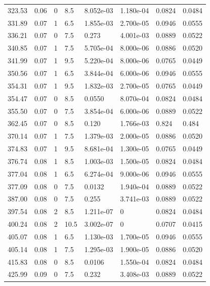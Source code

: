 \documentclass[preview]{standalone}
\begin{document}
{{{\begin{tabular}{L{1.2cm}C{1.2cm} C{0.3cm}C{0.5cm} C{1.4cm}C{1.4cm} C{1.4cm}C{1.4cm}}
  323.53  &  0.06  & 0     & 8.5 &  8.052e-03  & 1.180e-04  & 0.0824 &  0.0484   \\ 
  331.89  &  0.07  & 1     & 6.5 &  1.855e-03  & 2.700e-05  & 0.0946 &  0.0555   \\ 
  336.21  &  0.07  & 0     & 7.5 &  0.273  & 4.001e-03  & 0.0889 &  0.0522   \\ 
  340.85  &  0.07  & 1     & 7.5 &  5.705e-04  & 8.000e-06  & 0.0886 &  0.0520   \\ 
  341.99  &  0.07  & 1     & 9.5 &  5.220e-04  & 8.000e-06  & 0.0765 &  0.0449   \\ 
  350.56  &  0.07  & 1     & 6.5 &  3.844e-04  & 6.000e-06  & 0.0946 &  0.0555   \\ 
  354.31  &  0.07  & 1     & 9.5 &  1.832e-03  & 2.700e-05  & 0.0765 &  0.0449   \\ 
  354.47  &  0.07  & 0     & 8.5 &  0.0550  & 8.070e-04  & 0.0824 &  0.0484   \\ 
  355.50  &  0.07  & 0     & 7.5 &  3.854e-04  & 6.000e-06  & 0.0889 &  0.0522   \\ 
  362.45  &  0.07  & 0     & 8.5 &  0.120  & 1.766e-03  & 0.824 &  0.484   \\ 
  370.14  &  0.07  & 1     & 7.5 &  1.379e-03  & 2.000e-05  & 0.0886 &  0.0520   \\ 
  374.83  &  0.07  & 1     & 9.5 &  8.681e-04  & 1.300e-05  & 0.0765 &  0.0449   \\ 
  376.74  &  0.08  & 1     & 8.5 &  1.003e-03  & 1.500e-05  & 0.0824 &  0.0484   \\ 
  377.04  &  0.08  & 1     & 6.5 &  6.274e-04  & 9.000e-06  & 0.0946 &  0.0555   \\ 
  377.09  &  0.08  & 0     & 7.5 &  0.0132  & 1.940e-04  & 0.0889 &  0.0522   \\ 
  387.00  &  0.08  & 0     & 7.5 &  0.255  & 3.741e-03  & 0.0889 &  0.0522   \\ 
  397.54  &  0.08  & 2     & 8.5 &  1.211e-07  & 0  & 0.0824 &  0.0484   \\ 
  400.24  &  0.08  & 2     & 10.5 &  3.002e-07  & 0  & 0.0707 &  0.0415   \\ 
  405.07  &  0.08  & 1     & 6.5 &  1.130e-03  & 1.700e-05  & 0.0946 &  0.0555   \\ 
  405.14  &  0.08  & 1     & 7.5 &  1.295e-03  & 1.900e-05  & 0.0886 &  0.0520   \\ 
  415.83  &  0.08  & 0     & 8.5 &  0.0106  & 1.550e-04  & 0.0824 &  0.0484   \\ 
  425.99  &  0.09  & 0     & 7.5 &  0.232  & 3.408e-03  & 0.0889 &  0.0522   \\ 

\end{tabular}}}}
\end{document}
